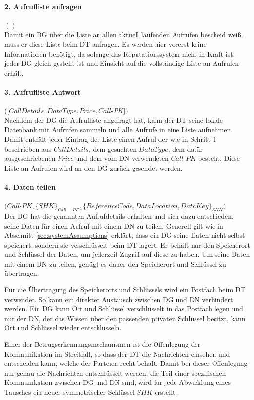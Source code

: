 \documentclass[
	fontsize=11pt,
	headings=small,
	parskip=half,           %
	bibliography=totoc,
	numbers=noenddot,       %
	open=any,               %
]{scrreprt}
\begin{document}
\paragraph{2. Aufrufliste anfragen} $()$\\
Damit ein DG über die Liste an allen aktuell laufenden Aufrufen bescheid weiß, muss er diese Liste beim DT anfragen. Es werden hier vorerst keine Informationen benötigt, da solange das Reputationssystem nicht in Kraft ist, jeder DG gleich gestellt ist und Einsicht auf die vollständige Liste an Aufrufen erhält.

\paragraph{3. Aufrufliste Antwort} $([CallDetails, DataType, Price, Call$-$PK])$\\
Nachdem der DG die Aufrufliste angefragt hat, kann der DT seine lokale Datenbank mit Aufrufen sammeln und alle Aufrufe in eine Liste aufnehmen. Damit enthält jeder Eintrag der Liste einen Aufruf der wie in Schritt 1 beschrieben aus $CallDetails$, dem gesuchten $DataType$, dem dafür ausgeschriebenen $Price$ und dem vom DN verwendeten $Call$-$PK$ besteht. Diese Liste an Aufrufen wird an den DG zurück gesendet werden.

\paragraph{4. Daten teilen} $(Call$-$PK, \{SHK\}_{Call-PK}, \{ReferenceCode, DataLocation, DataKey\}_{SHK})$\\
Der DG hat die genannten Aufrufdetails erhalten und sich dazu entschieden, seine Daten für einen Aufruf mit einem DN zu teilen. Generell gilt wie in Abschnitt \ref{sec:systemAssumptions} erklärt, dass ein DG seine Daten nicht selbst speichert, sondern sie verschlüsselt beim DT lagert. Er behält nur den Speicherort und Schlüssel der Daten, um jederzeit Zugriff auf diese zu haben. Um seine Daten mit einem DN zu teilen, genügt es daher den Speicherort und Schlüssel zu übertragen.

Für die Übertragung des Speicherorts und Schlüssels wird ein Postfach beim DT verwendet. So kann ein direkter Austausch zwischen DG und DN verhindert werden. Ein DG kann Ort und Schlüssel verschlüsselt in das Postfach legen und nur der DN, der das Wissen über den passenden privaten Schlüssel besitzt, kann Ort und Schlüssel wieder entschlüsseln.

Einer der Betrugserkennungsmechanismen ist die Offenlegung der Kommunikation im Streitfall, so dass der DT die Nachrichten einsehen und entscheiden kann, welche der Parteien recht behält. Damit bei dieser Offenlegung nur genau die Nachrichten entschlüsselt werden, die Teil einer spezifischen Kommunikation zwischen DG und DN sind, wird für jede Abwicklung eines Tausches ein neuer symmetrischer Schlüssel $SHK$ erstellt.
\end{document}
